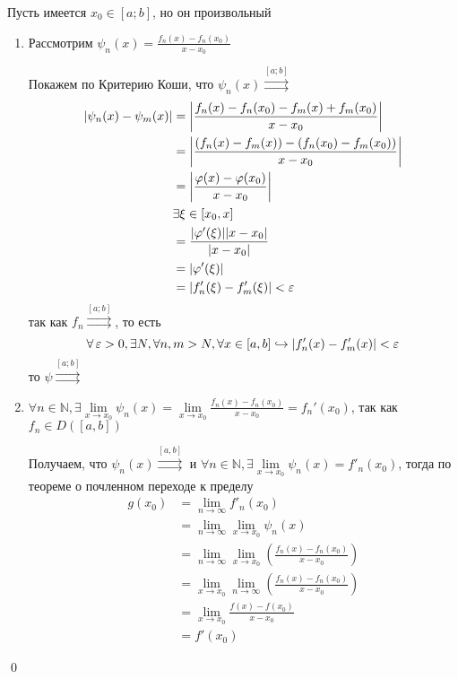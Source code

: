 \documentclass[a4paper, 10pt]{article}
\begin{document}
Пусть имеется $x_0\in[a;b]$, но он произвольный
\begin{enumerate}
    \item Рассмотрим $\psi_n(x)=\displaystyle\frac{f_n(x)-f_n(x_0)}{x-x_0}$
    
    Покажем по Критерию Коши, что $\psi_n(x)\overset{[a;b]}{\rightrightarrows}$
    \begin{equation*}
        \begin{aligned}
            |\psi_n(x)-\psi_m(x)|&=\left|\frac{f_n(x)-f_n(x_0)-f_m(x)+f_m(x_0)}{x-x_0}\right|\\
            &=\left|\frac{(f_n(x)-f_m(x))-(f_n(x_0)-f_m(x_0))}{x-x_0}\right|\\
            &=\left|\frac{\varphi(x)-\varphi(x_0)}{x-x_0}\right|\\
            &\exists\xi\in[x_0, x]\\
            &=\frac{|\varphi'(\xi)||x-x_0|}{|x-x_0|}\\
            &=|\varphi'(\xi)|\\
            &=|f_n'(\xi)-f'_m(\xi)|<\operatorname{\varepsilon}
        \end{aligned}
    \end{equation*}
    так как $f_n\overset{[a;b]}{\rightrightarrows}$, то есть 
    \begin{equation*}
        \forall\operatorname{\varepsilon}>0,\exists N,\forall n,m>N,\forall x\in[a,b]\hookrightarrow|f_n'(x)-f'_m(x)|<\operatorname{\varepsilon}
    \end{equation*}
    то $\psi\overset{[a;b]}{\rightrightarrows}$

    \item $\forall n\in\mathbb{N},\exists\lim\limits_{x\to x_0}\psi_n(x)=\lim\limits_{x\to x_0}\displaystyle\frac{f_n(x)-f_n(x_0)}{x-x_0}=f_n'(x_0)$, так как $f_n\in D([a,b])$
    
    Получаем, что $\psi_n(x)\overset{[a, b]}{\rightrightarrows}$ и $\forall n\in\mathbb{N},\exists\lim\limits_{x\to x_0}\psi_n(x)=f'_n(x_0)$, тогда по теореме о почленном переходе к пределу
    \begin{equation*}
        \begin{aligned}
            g(x_0)&=\lim_{n\to\infty}f'_n(x_0)\\
            &=\lim_{n\to\infty}\lim_{x\to x_0}\psi_n(x)\\
            &=\lim_{n\to\infty}\lim_{x\to x_0}\left(\frac{f_n(x)-f_n(x_0)}{x-x_0}\right)\\
            &=\lim_{x\to x_0}\lim_{n\to\infty}\left(\frac{f_n(x)-f_n(x_0)}{x-x_0}\right)\\
            &=\lim_{x\to x_0}\frac{f(x)-f(x_0)}{x-x_0}\\
            &=f'(x_0)
        \end{aligned}
    \end{equation*}
\end{enumerate}\qed
\end{document}
